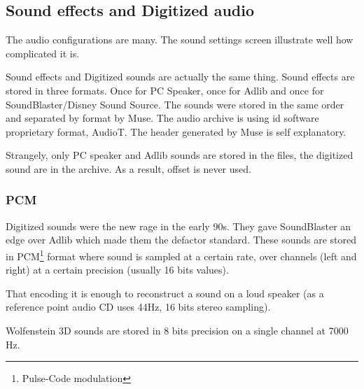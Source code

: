 \subsection{Sound effects and Digitized audio}
The audio configurations are many. The sound settings screen illustrate well how complicated it is.
\par
\begin{figure}[H]
\centering
 \end{figure}
\par
Sound effects and Digitized sounds are actually the same thing. Sound effects are stored in three formats. Once for PC Speaker, once for Adlib and once for SoundBlaster/Disney Sound Source. The sounds were stored in the same order and separated by format by Muse. The audio archive is using id software proprietary format, AudioT. The header generated by Muse is self explanatory.\\

\par
\begin{minipage}{\textwidth}

\end{minipage}
\par
Strangely, only PC speaker and Adlib sounds are stored in the  files, the digitized sound are in the archive. As a result, offset  is never used.\\
\par


\subsubsection{PCM}
Digitized sounds were the new rage in the early 90s. They gave SoundBlaster an edge over Adlib which made them the defactor standard. These sounds are stored in PCM\footnote{Pulse-Code modulation} format where sound is sampled at a certain rate, over channels (left and right) at a certain precision (usually 16 bits values).\\
\par
That encoding it is enough to reconstruct a sound on a loud speaker (as a reference point audio CD uses 44Hz, 16 bits stereo sampling).\\
\par

Wolfenstein 3D sounds are stored in 8 bits precision on a single channel at 7000 Hz.\\




